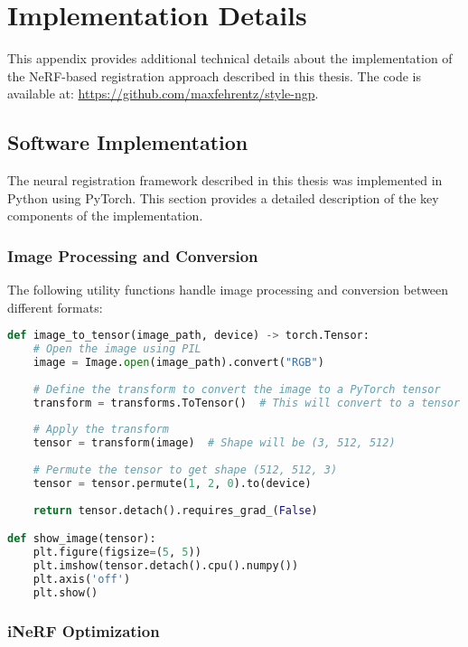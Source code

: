\chapter{Implementation Details}\label{appendix:implementation}

This appendix provides additional technical details about the implementation of the NeRF-based registration approach described in this thesis. The code is available at: \url{https://github.com/maxfehrentz/style-ngp}.

\section{Software Implementation}

The neural registration framework described in this thesis was implemented in Python using PyTorch. This section provides a detailed description of the key components of the implementation.

\subsection{Image Processing and Conversion}

The following utility functions handle image processing and conversion between different formats:

\begin{lstlisting}[language=Python]
def image_to_tensor(image_path, device) -> torch.Tensor:
    # Open the image using PIL
    image = Image.open(image_path).convert("RGB")
    
    # Define the transform to convert the image to a PyTorch tensor
    transform = transforms.ToTensor()  # This will convert to a tensor with shape (C, H, W)
    
    # Apply the transform
    tensor = transform(image)  # Shape will be (3, 512, 512)
    
    # Permute the tensor to get shape (512, 512, 3)
    tensor = tensor.permute(1, 2, 0).to(device)
    
    return tensor.detach().requires_grad_(False)

def show_image(tensor):
    plt.figure(figsize=(5, 5))
    plt.imshow(tensor.detach().cpu().numpy())
    plt.axis('off')
    plt.show()
\end{lstlisting}

\subsection{iNeRF Optimization}

